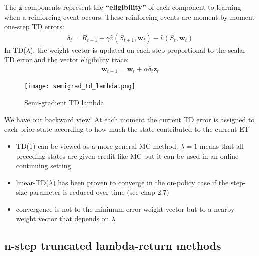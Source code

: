 \documentclass[sutton_barto_notes.tex]{subfiles}
\begin{document}
 The $\mathbf{z}$ components represent the \textbf{“eligibility”} of each component to learning when a reinforcing event occurs. These reinforcing events are moment-by-moment one-step TD errors: 
\begin{align}\delta_t = R_{t+1} + \gamma \hat{v}(S_{t+1}, \mathbf{w}_t) - \hat{v}(S_t, \mathbf{w}_t) \label{eq:12.5}\tag{12.5}\end{align}
 In TD($\lambda$), the weight vector is updated on each step proportional to the scalar TD error and the vector eligibility trace: 
\begin{align}\mathbf{w}_{t+1} = \mathbf{w}_t + \alpha \delta_t \mathbf{z}_t \label{eq:12.6}\tag{12.6}\end{align}

\begin{figure}[h!]
    \centering
     \texttt{[image: semigrad\_td\_lambda.png]}
    \caption{ Semi-gradient TD lambda }
\end{figure}

 We have our backward view! At each moment the current TD error is assigned to each prior state according to how much the state contributed to the current ET 
\begin{itemize}
\item TD(1) can be viewed as a more general MC method. $\lambda = 1$ means that all preceding states are given credit like MC but it can be used in an online continuing setting 
\item linear-TD($\lambda$) has been proven to converge in the on-policy case if the step-size parameter is reduced over time (see chap 2.7) 
\item convergence is not to the minimum-error weight vector but to a nearby weight vector that depends on $\lambda$ 
\end{itemize}

\subsection{n-step truncated lambda-return methods}
\end{document}
